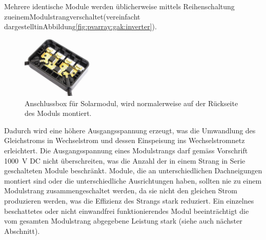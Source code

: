 Mehrere  identische  Module  werden  \"ublicherweise  mittels  Reihenschaltung
zu\hfill  einem\hfill  Modulstrang\hfill verschaltet\hfill  (vereinfacht\hfill
dargestellt\hfill in\hfill Abbildung\hfill \ref{fig:pvarray:gak:inverter}).

\begin{figure}
    \centering
    \includegraphics[width=0.3\textwidth]{images/solar-facility/pvJunctionBox.jpeg}
    \caption{
        Anschlussbox f\"ur Solarmodul, wird  normalerweise auf der R\"uckseite
        des Moduls montiert. \cite{ref:junctionBox}%
    }
    \label{fig:pvJunctionBox}
\end{figure}

\noindent  Dadurch  wird  eine  h\"ohere  Ausgangsspannung  erzeugt,  was  die
Umwandlung  des  Gleichstroms  in  Wechselstrom  und  dessen  Einspeisung  ins
Wechselstromnetz  erleichtert. Die  Ausgangsspannung eines  Modulstrangs  darf
gem\"ass Vorschrift \SI{1000}{\volt} DC  nicht \"uberschreiten, was die Anzahl
der in  einem Strang in  Serie geschalteten Module beschr\"ankt.   Module, die
an  unterschiedlichen Dachneigungen  montiert sind  oder die  unterschiedliche
Ausrichtungen  haben,  sollten  nie zu  einem  Modulstrang  zusammengeschaltet
werden, da sie nicht den gleichen  Strom produzieren werden, was die Effizienz
des Strangs stark reduziert. Ein einzelnes beschattetes oder nicht einwandfrei
funktionierendes   Modul  beeintr\"achtigt   die   vom  gesamten   Modulstrang
abgegebene Leistung stark (siehe auch n\"achster Abschnitt).

